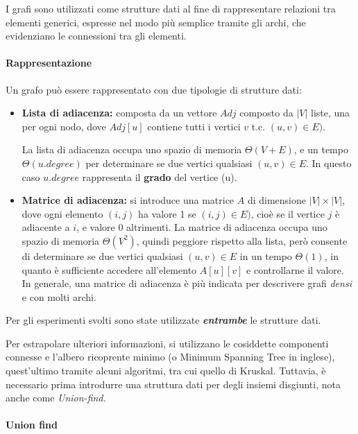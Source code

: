 \documentclass[
]{article}
\begin{document}
I grafi sono utilizzati come strutture dati al fine di rappresentare
relazioni tra elementi generici, espresse nel modo più semplice tramite
gli archi, che evidenziano le connessioni tra gli elementi.

\hypertarget{rappresentazione}{%
\paragraph{Rappresentazione}\label{rappresentazione}}

Un grafo può essere rappresentato con due tipologie di strutture dati:

\begin{itemize}
\item
  \textbf{Lista di adiacenza:} composta da un vettore \(Adj\) composto
  da \(|V|\) liste, una per ogni nodo, dove \(Adj[u]\) contiene tutti i
  vertici \(v\) t.c. \((u, v) \in E)\).

  La lista di adiacenza occupa uno spazio di memoria \(\Theta(V + E)\),
  e un tempo \(\Theta(u.degree)\) per determinare se due vertici
  qualsiasi \((u, v) \in E\). In questo caso \(u.degree\) rappresenta il
  \textbf{grado} del vertice (u).
\item
  \textbf{Matrice di adiacenza:} si introduce una matrice \(A\) di
  dimensione \(|V|\times|V|\), dove ogni elemento \((i,j)\) ha valore 1
  se \((i, j) \in E)\), cioè se il vertice \(j\) è adiacente a \(i\), e
  valore 0 altrimenti. La matrice di adiacenza occupa uno spazio di
  memoria \(\Theta(V^2)\), quindi peggiore rispetto alla lista, però
  consente di determinare se due vertici qualsiasi \((u, v) \in E\) in
  un tempo \(\Theta(1)\), in quanto è sufficiente accedere all'elemento
  \(A[u][v]\) e controllarne il valore. In generale, una matrice di
  adiacenza è più indicata per descrivere grafi \emph{densi} e con molti
  archi.
\end{itemize}

Per gli esperimenti svolti sono state utilizzate
\textbf{\emph{entrambe}} le strutture dati.

Per estrapolare ulteriori informazioni, si utilizzano le cosiddette
componenti connesse e l'albero ricoprente minimo (o Minimum Spanning
Tree in inglese), quest'ultimo tramite alcuni algoritmi, tra cui quello
di Kruskal. Tuttavia, è necessario prima introdurre una struttura dati
per degli insiemi disgiunti, nota anche come \emph{Union-find.}

\hypertarget{union-find}{%
\paragraph{Union find}\label{union-find}}
\end{document}
